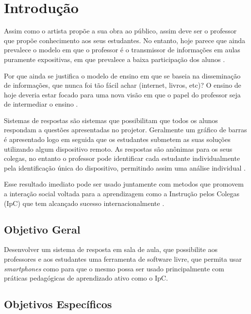 \chapter{Introdução}

Assim como o artista propõe a sua obra ao público, assim deve ser o professor que
propõe conhecimento aos seus estudantes. No entanto, hoje parece que ainda prevalece
o modelo em que o professor é o transmissor de informações em aulas puramente expositivas,
em que prevalece a baixa participação dos alunos \cite[p. 8]{Silva2001}.

Por que ainda se justifica o modelo de ensino em que se baseia
na disseminação de informações, que nunca foi tão fácil achar (internet,
livros, etc)? O ensino de hoje deveria estar focado para uma nova
visão em que o papel do professor seja de intermediar o ensino \cite[p. 19]{Araujo2013}.

Sistemas de respostas são sistemas que possibilitam que todos os alunos
respondam a questões apresentadas no projetor. Geralmente um gráfico de barras
é apresentado logo em seguida que os estudantes submetem as suas soluções
utilizando algum dispositivo remoto. As respostas são anônimas para os seus colegas,
no entanto o professor pode identificar cada estudante individualmente pela
identificação única do dispositivo, permitindo assim uma análise individual \cite[p. 1]{Kay2009}.


Esse resultado imediato pode ser usado juntamente
com metodos que promovem a interação social voltada para a aprendizagem como a
Instrução pelos Colegas (IpC) que tem alcançado sucesso internacionalmente \cite[p. 3]{Araujo2013}.

\section{Objetivo Geral}
Desenvolver um sistema de resposta em sala de aula,
que possibilite aos professores e aos estudantes uma ferramenta de software livre,
que permita usar {\textit{smartphones}} como {\clickers}
para que o mesmo possa
ser usado principalmente com práticas pedagógicas de aprendizado ativo como o IpC.

\section{Objetivos Específicos}

